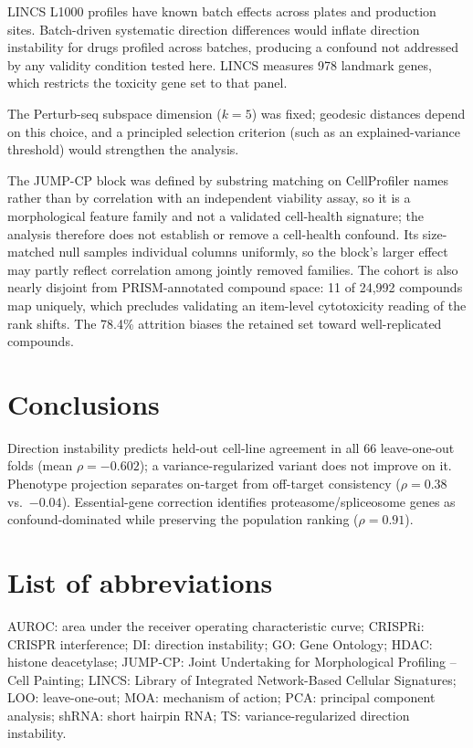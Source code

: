 \documentclass[11pt]{article}
\begin{document}
LINCS L1000 profiles have known batch effects across plates and
production sites. Batch-driven systematic direction differences would
inflate direction instability for drugs profiled across batches,
producing a confound not addressed by any validity condition tested here.
LINCS measures 978 landmark genes, which restricts the toxicity gene set to
that panel.

The Perturb-seq subspace dimension ($k = 5$) was fixed; geodesic
distances depend on this choice, and a principled selection criterion
(such as an explained-variance threshold) would strengthen the analysis.

The JUMP-CP block was defined by substring matching on CellProfiler names
rather than by correlation with an independent viability assay, so it is a
morphological feature family and not a validated cell-health signature; the
analysis therefore does not establish or remove a cell-health confound. Its
size-matched null samples individual columns uniformly, so the block's larger
effect may partly reflect correlation among jointly removed families. The
cohort is also nearly disjoint from PRISM-annotated compound space: 11 of
24{,}992 compounds map uniquely, which precludes validating an item-level
cytotoxicity reading of the rank shifts. The 78.4\% attrition biases the
retained set toward well-replicated compounds.

\section{Conclusions}

Direction instability predicts held-out cell-line agreement in all 66
leave-one-out folds (mean $\rho = -0.602$); a variance-regularized variant
does not improve on it.
Phenotype projection separates on-target from off-target consistency
($\rho = 0.38$ vs.\ $-0.04$). Essential-gene correction identifies
proteasome/spliceosome genes as confound-dominated while preserving the
population ranking ($\rho = 0.91$).

\section*{List of abbreviations}
AUROC: area under the receiver operating characteristic curve;
CRISPRi: CRISPR interference;
DI: direction instability;
GO: Gene Ontology;
HDAC: histone deacetylase;
JUMP-CP: Joint Undertaking for Morphological Profiling -- Cell Painting;
LINCS: Library of Integrated Network-Based Cellular Signatures;
LOO: leave-one-out;
MOA: mechanism of action;
PCA: principal component analysis;
shRNA: short hairpin RNA;
TS: variance-regularized direction instability.
\end{document}
